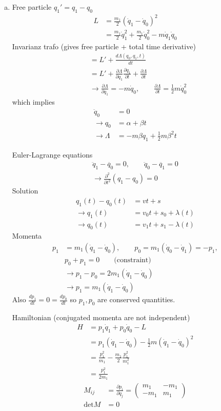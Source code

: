 \documentclass[10pt,a4paper]{report}
\theoremstyle{definition}
\begin{document}
\begin{enumerate}[a)]
\item Free particle $q_1'=q_1-q_0$
\begin{align}
L&=\frac{m_1}{2}(\dot{q}_1-\dot{q}_0)^2\\
&=\frac{m_1}{2}\dot{q}_1^2+\frac{m_1}{2}\dot{q}_0^2-m\dot{q}_1\dot{q}_0
\end{align}
Invarianz trafo (gives free particle + total time derivative)
\begin{align}
&=L'+\frac{d\Lambda(q_0,q_1,t)}{dt}\\
&=L'+\frac{\partial\Lambda}{\partial q_1}\frac{\partial q_1}{\partial t}+\frac{\partial\Lambda}{\partial t}\\
&\rightarrow \frac{\partial\Lambda}{\partial q_1}=-m\dot{q}_0,\qquad \frac{\partial\Lambda}{\partial t}=\frac{1}{2}m\dot{q}_0^2
\end{align}
which implies
\begin{align}
\ddot{q}_0&=0\\
\rightarrow q_0&=\alpha+\beta t\\
\rightarrow \Lambda&=-m\beta q_1+\frac{1}{2}m\beta^2t
\end{align}


Euler-Lagrange equations
\begin{align}
\ddot{q}_1-\ddot{q_0}=0,\qquad\ddot{q}_0-\ddot{q_1}=0\\
\rightarrow \frac{\partial^2}{\partial t^2}(q_1-q_0)=0
\end{align}
Solution
\begin{align}
q_1(t)-q_0(t)&=vt+s\\
\rightarrow q_1(t)&=v_0t+s_0+\lambda(t)\\
\rightarrow q_0(t)&=v_1t+s_1-\lambda(t)
\end{align}
Momenta
\begin{align}
p_1&=m_1(\dot{q}_1-\dot{q}_0),\qquad p_0=m_1(\dot{q}_0-\dot{q}_1)=-p_1,\\ &p_0+p_1=0\qquad\text{(constraint)}\\
&\rightarrow p_1-p_0=2m_1(\dot{q}_1-\dot{q}_0)\\
&\rightarrow p_1=m_1(\dot{q}_1-\dot{q}_0)
\end{align}
Also $\frac{dp_1}{dt}=0=\frac{dp_0}{dt}$ so $p_1, p_0$ are conserved quantities.


Hamiltonian (conjugated momenta are not independent)
\begin{align}
H&=p_1\dot{q}_1+p_0\dot{q}_0-L\\
&=p_1(\dot{q}_1-\dot{q}_0)-\frac{1}{2}m(\dot{q}_1-\dot{q}_0)^2\\
&=\frac{p_1^2}{m_1}-\frac{m_1}{2}\frac{p_1^2}{m_1^2}\\
&=\frac{p_1^2}{2m_1}
\end{align}
\begin{align}
M_{ij}&=\frac{\partial p_i}{\partial \dot{q}_j}=\left(\begin{array}{cc}
m_1 & -m_1\\
-m_1 & m_1
\end{array}\right)\\
\text{det}M&=0
\end{align}


\end{enumerate}
\end{document}
